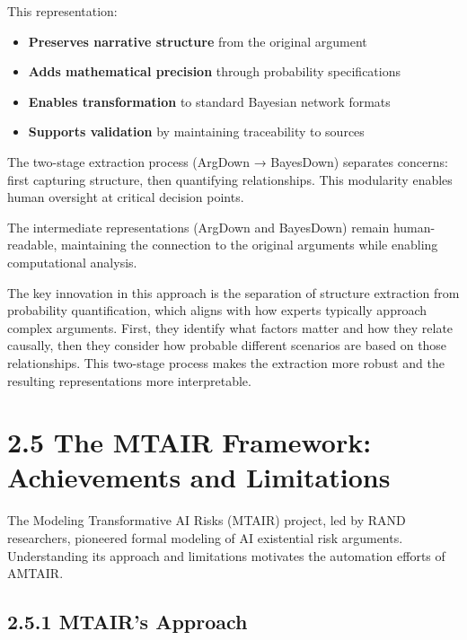 \documentclass[
  11pt,
  letterpaper,
]{book}
\providecommand{\tightlist}{%
  \setlength{\itemsep}{0pt}\setlength{\parskip}{0pt}}
\begin{document}
This representation:

\begin{itemize}
\tightlist
\item
  \textbf{Preserves narrative structure} from the original argument
\item
  \textbf{Adds mathematical precision} through probability
  specifications
\item
  \textbf{Enables transformation} to standard Bayesian network formats
\item
  \textbf{Supports validation} by maintaining traceability to sources
\end{itemize}

The two-stage extraction process (ArgDown → BayesDown) separates
concerns: first capturing structure, then quantifying relationships.
This modularity enables human oversight at critical decision points.

The intermediate representations (ArgDown and BayesDown) remain
human-readable, maintaining the connection to the original arguments
while enabling computational analysis.

The key innovation in this approach is the separation of structure
extraction from probability quantification, which aligns with how
experts typically approach complex arguments. First, they identify what
factors matter and how they relate causally, then they consider how
probable different scenarios are based on those relationships. This
two-stage process makes the extraction more robust and the resulting
representations more interpretable.

\section*{2.5 The MTAIR Framework: Achievements and
Limitations}\label{sec-mtair-framework}


The Modeling Transformative AI Risks (MTAIR) project, led by RAND
researchers, pioneered formal modeling of AI existential risk arguments.
Understanding its approach and limitations motivates the automation
efforts of AMTAIR.

\subsection*{2.5.1 MTAIR's Approach}\label{sec-mtair-approach}
\end{document}
